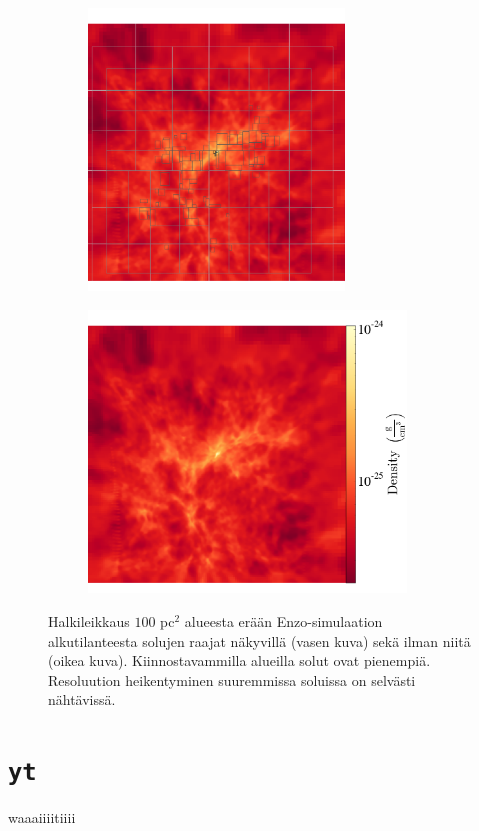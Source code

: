 \documentclass[12pt,a4paper]{article}
\begin{document}
\begin{figure}
   \centering
   \begin{subfigure}[b]{0.45\textwidth}
       \includegraphics[height=7.5cm]{../kuvat/amr-grid.png}
   \end{subfigure}
   \begin{subfigure}[b]{0.45\textwidth}
       \includegraphics[height=7.5cm]{../kuvat/amr-nogrid.png}
   \end{subfigure}
   \caption{Halkileikkaus $100$ pc$^2$ alueesta erään Enzo-simulaation alkutilanteesta solujen raajat näkyvillä (vasen kuva) sekä ilman niitä (oikea kuva). Kiinnostavammilla alueilla solut ovat pienempiä. Resoluution heikentyminen suuremmissa soluissa on selvästi nähtävissä.}\label{fig:enzogrid} %

\end{figure}

\section{\texttt{yt}}
waaaiiiitiiii
\end{document}
